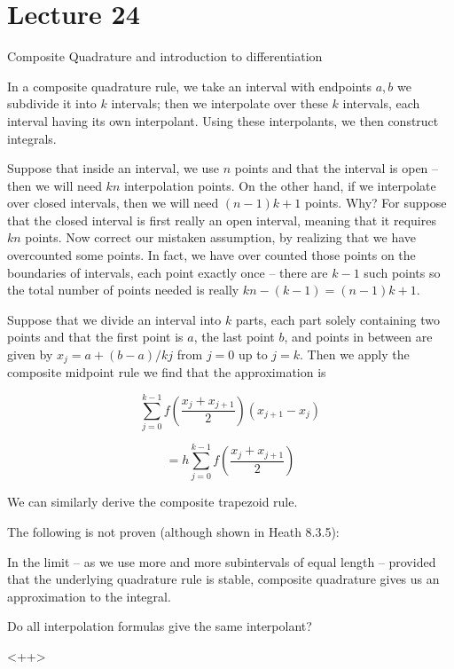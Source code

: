 \documentclass[../main.tex]{subfiles}
\begin{document}
\section{Lecture 24}{Composite Quadrature and introduction to differentiation}


\begin{definition}
    In a composite quadrature rule, we take an interval with endpoints
    $a,b$ we subdivide it into $k$ intervals; then we interpolate
    over these $k$ intervals, each interval having its own interpolant.
    Using these interpolants, we then construct integrals.
\end{definition}

\begin{remark}
    Suppose that inside an interval, we use $n$ points and that
    the interval is open -- then we will need $kn$ interpolation points.
    On the other hand, if we interpolate over closed intervals,
    then we will need $(n-1)k + 1$ points. Why? For suppose that
    the closed interval is first really an open interval, meaning
    that it requires $kn$ points. Now correct our mistaken 
    assumption, by realizing that we have overcounted some
    points. In fact, we have over counted those points on the
    boundaries of intervals, each point exactly once -- there
    are $k-1$ such points so the total number of points needed
    is really $kn - (k-1) = (n-1)k + 1$.
\end{remark}

\begin{example}
    Suppose that we divide an interval into $k$ parts, each part
    solely containing two points and that
    the first point is $a$, the last point $b$, and points in
    between are given by $x_j = a + (b-a)/k j$ from $j = 0$ up
    to $j = k$. Then we apply the composite midpoint rule we find
    that the approximation is

    \[
        \sum_{j=0}^{k-1}f(\frac{x_{j} + x_{j+1}}{2})(x_{j+1} - x_{j})
    \]

    \[
        = h \sum_{j=0}^{k-1} f(\frac{x_{j} + x_{j+1}}{2})
    \]

    We can similarly derive the composite trapezoid rule.
\end{example}

The following is not proven (although shown in Heath 8.3.5):

\begin{proposition}
    In the limit -- as we use more and more subintervals of equal length -- provided
    that the underlying quadrature rule is stable, composite
    quadrature gives us an approximation to the integral.
\end{proposition}

\begin{unresolved}
    Do all interpolation formulas give the same interpolant?
\end{unresolved}<++>
\end{document}
